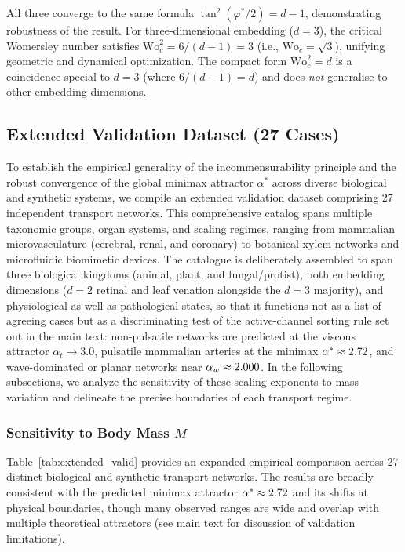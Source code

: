 \documentclass[11pt,a4paper]{article}
\theoremstyle{remark}
\begin{document}
All three converge to the same formula $\tan^2(\varphi^*/2) = d - 1$,
demonstrating robustness of the result. For three-dimensional embedding ($d=3$),
the critical Womersley number satisfies $\mathrm{Wo}_c^2 = 6/(d-1) = 3$ (i.e.,
$\mathrm{Wo}_c = \sqrt{3}$), unifying geometric and dynamical optimization.
The compact form $\mathrm{Wo}_c^2 = d$ is a coincidence special to $d=3$
(where $6/(d-1)=d$) and does \emph{not} generalise to other embedding
dimensions.


\subsection{Extended Validation Dataset (27 Cases)}

To establish the empirical generality of the incommensurability principle and
the robust convergence of the global minimax attractor $\alpha^*$ across diverse
biological and synthetic systems, we compile an extended validation dataset
comprising 27 independent transport networks. This comprehensive catalog spans
multiple taxonomic groups, organ systems, and scaling regimes, ranging from
mammalian microvasculature (cerebral, renal, and coronary) to botanical xylem
networks and microfluidic biomimetic devices. The catalogue is
deliberately assembled to span three biological kingdoms (animal, plant, and
fungal/protist), both embedding dimensions ($d=2$ retinal and leaf venation
alongside the $d=3$ majority), and physiological as well as pathological states,
so that it functions not as a list of agreeing cases but as a discriminating
test of the active-channel sorting rule set out in the main text: non-pulsatile
networks are predicted at the viscous attractor $\alpha_t \to 3.0$, pulsatile
mammalian arteries at the minimax $\alpha^* \approx 2.72$, and
wave-dominated or planar networks near $\alpha_w \approx 2.000$. In the
following subsections, we analyze the sensitivity of these scaling exponents to
mass variation and delineate the precise boundaries of each transport regime.

\subsubsection{Sensitivity to Body Mass $M$}

Table~\ref{tab:extended_valid} provides an expanded empirical comparison across
27 distinct biological and synthetic transport networks. The results are broadly
consistent with the predicted minimax attractor $\alpha^* \approx 2.72$
and its shifts at physical boundaries, though many observed ranges are wide and
overlap with multiple theoretical attractors (see main text for discussion of
validation limitations).
\end{document}
